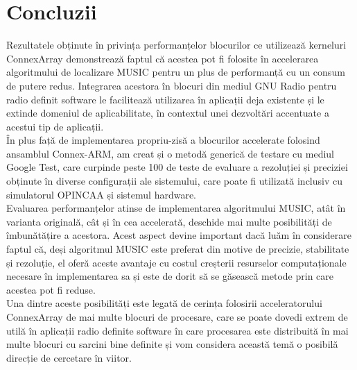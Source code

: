 \chapter{Concluzii}
\label{chapter:concl}

Rezultatele obținute în privința performanțelor blocurilor ce utilizează
kerneluri ConnexArray demonstrează faptul că acestea pot fi folosite în
accelerarea algoritmului de localizare MUSIC pentru un plus de performanță cu un
consum de putere redus. Integrarea acestora în blocuri din mediul
GNU Radio pentru radio definit software le facilitează utilizarea în aplicații
deja existente și le extinde domeniul de aplicabilitate, în contextul unei
dezvoltări accentuate a acestui tip de aplicații. \\

În plus față de implementarea propriu-zisă a blocurilor accelerate folosind
ansamblul Connex-ARM, am creat și o metodă generică de testare cu mediul
Google Test, care curpinde peste 100 de teste de evaluare a rezoluției și
preciziei obținute în diverse configurații ale sistemului, care poate fi
utilizată inclusiv cu simulatorul OPINCAA și sistemul hardware. \\

Evaluarea performanțelor atinse de implementarea algoritmului MUSIC, atât în
varianta originală, cât și în cea accelerată, deschide mai multe posibilități de
îmbunătățire a acestora. Acest aspect devine important dacă luăm în considerare
faptul că, deși algoritmul MUSIC este preferat din motive de precizie,
stabilitate și rezoluție, el oferă aceste avantaje cu costul creșterii
resurselor computaționale necesare în implementarea sa și este de dorit să se
găsească metode prin care acestea pot fi reduse. \\

Una dintre aceste posibilități este legată de cerința folosirii acceleratorului
ConnexArray de mai multe blocuri de procesare, care se poate dovedi extrem de
utilă în aplicații radio definite software în care procesarea este distribuită
în mai multe blocuri cu sarcini bine definite și vom considera această temă o
posibilă direcție de cercetare în viitor.

